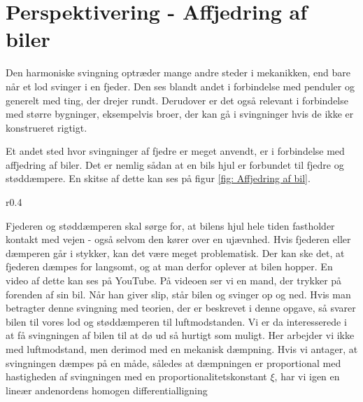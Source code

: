 \chapter{Perspektivering - Affjedring af biler}
Den harmoniske svingning optræder mange andre steder i mekanikken, end bare når et lod svinger i en fjeder.
Den ses blandt andet i forbindelse med penduler og generelt med ting, der drejer rundt.
Derudover er det også relevant i forbindelse med større bygninger, eksempelvis broer, der kan gå i svingninger hvis de ikke er konstrueret rigtigt. 

Et andet sted hvor svingninger af fjedre er meget anvendt, er i forbindelse med affjedring af biler. 
Det er nemlig sådan at en bils hjul er forbundet til fjedre og støddæmpere. 
En skitse af dette kan ses på figur \ref{fig: Affjedring af bil}.

\begin{wrapfigure}{r}{0.4\textwidth}
\center
{}
\caption{Skitsetegning af en dæmpet fjeder (blå) fastsat til bils hjul.}
\label{fig: Affjedring af bil}
\end{wrapfigure}

Fjederen og støddæmperen skal sørge for, at bilens hjul hele tiden fastholder kontakt med vejen - også selvom den kører over en ujævnhed. 
Hvis fjederen eller dæmperen går i stykker, kan det være meget problematisk. 
Der kan ske det, at fjederen dæmpes for langsomt, og at man derfor oplever at bilen hopper.
En video af dette kan ses på YouTube.
På videoen ser vi en mand, der trykker på forenden af sin bil. 
Når han giver slip, står bilen og svinger op og ned. 
Hvis man betragter denne svingning med teorien, der er beskrevet i denne opgave, så svarer bilen til vores lod og støddæmperen til luftmodstanden.
Vi er da interesserede i at få svingningen af bilen til at dø ud så hurtigt som muligt. 
Her arbejder vi ikke med luftmodstand, men derimod med en mekanisk dæmpning. 
Hvis vi antager, at svingningen dæmpes på en måde, således at dæmpningen er proportional med hastigheden af svingningen med en proportionalitetskonstant $\xi$, har vi igen en lineær andenordens homogen differentialligning

